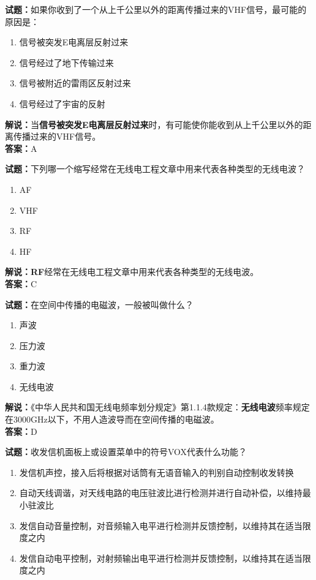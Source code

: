 \documentclass{ctexbook}
\begin{document}
\bigskip


\noindent\textbf{试题：}如果你收到了一个从上千公里以外的距离传播过来的VHF信号，最可能的原因是：

\begin{enumerate}[leftmargin=3em]
	\item 信号被突发E电离层反射过来
	\item 信号经过了地下传输过来
	\item 信号被附近的雷雨区反射过来
	\item 信号经过了宇宙的反射
\end{enumerate}

\noindent\textbf{解说：}当\textbf{信号被突发E电离层反射过来}时，有可能使你能收到从上千公里以外的距离传播过来的VHF信号。\\\noindent\textbf{答案：}A


\bigskip


\noindent\textbf{试题：}下列哪一个缩写经常在无线电工程文章中用来代表各种类型的无线电波？

\begin{enumerate}[leftmargin=3em]
	\item AF
	\item VHF
	\item RF
	\item HF
\end{enumerate}

\noindent\textbf{解说：RF}经常在无线电工程文章中用来代表各种类型的无线电波。\\\noindent\textbf{答案：}C


\bigskip


\noindent\textbf{试题：}在空间中传播的电磁波，一般被叫做什么？

\begin{enumerate}[leftmargin=3em]
	\item 声波
	\item 压力波
	\item 重力波
	\item 无线电波
\end{enumerate}

\noindent\textbf{解说：}《中华人民共和国无线电频率划分规定》第1.1.4款规定：\textbf{无线电波}频率规定在3000GHz以下，不用人造波导而在空间传播的电磁波。\\\noindent\textbf{答案：}D


\bigskip


\noindent\textbf{试题：}收发信机面板上或设置菜单中的符号VOX代表什么功能？

\begin{enumerate}[leftmargin=3em]
	\item 发信机声控，接入后将根据对话筒有无语音输入的判别自动控制收发转换
	\item 自动天线调谐，对天线电路的电压驻波比进行检测并进行自动补偿，以维持最小驻波比
	\item 发信自动音量控制，对音频输入电平进行检测并反馈控制，以维持其在适当限度之内
	\item 发信自动电平控制，对射频输出电平进行检测并反馈控制，以维持其在适当限度之内
\end{enumerate}
\end{document}
